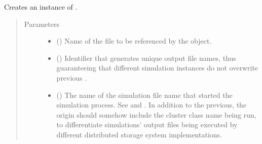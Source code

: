 \documentclass[letterpaper,10pt,english]{sphinxmanual}
\begin{document}
\begin{fulllineitems}
\begin{fulllineitems}
\begin{quote}
\begin{description}
\end{description}\end{quote}

\end{fulllineitems}


\begin{fulllineitems}
\label{\detokenize{app.domain.helpers:app.domain.helpers.smart_dataclasses.FileData.__init__}}
Creates an instance of .
\begin{quote}\begin{description}
\item[{Parameters}] \leavevmode\begin{itemize}
\item {} 
 () \textendash{} Name of the file to be referenced by the  object.

\item {} 
 () \textendash{} Identifier that generates unique output file names,
thus guaranteeing that different simulation instances do not
overwrite previous {\hyperref[\detokenize{app.domain.helpers:app.domain.helpers.smart_dataclasses.FileData.out_file}]{}}.

\item {} 
 () \textendash{} The name of the simulation file name that started
the simulation process. See
{\hyperref[\detokenize{app.domain:app.domain.master_servers.Master}]{}} and
{\hyperref[\detokenize{app:module-app.hive_simulation}]{}}. In addition to the previous,
the origin should somehow include the cluster class name
being run, to differentiate simulations’ output files being
executed by different distributed storage system
implementations.


\end{itemize}
\end{description}
\end{quote}
\end{fulllineitems}
\end{fulllineitems}
\end{document}
